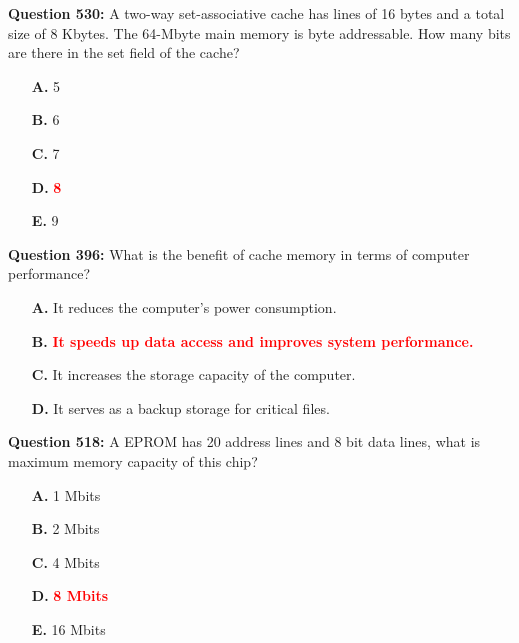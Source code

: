 \documentclass[12pt,a4paper]{article}
\begin{document}
\vspace{0.5cm}

\vspace{0.5cm}

\textbf{Question 530:} A two-way set-associative cache has lines of 16 bytes and a total size of 8 Kbytes. The 64-Mbyte main memory is byte addressable. How many bits are there in the set field of the cache?

\begin{itemize}
    \item[\textbf{A.}] 5
    \item[\textbf{B.}] 6
    \item[\textbf{C.}] 7
    \item[\textbf{D.}] \textcolor{red}{\textbf{8}}
    \item[\textbf{E.}] 9
\end{itemize}

\vspace{0.5cm}

\vspace{0.5cm}

\textbf{Question 396:} What is the benefit of cache memory in terms of computer performance?

\begin{itemize}
    \item[\textbf{A.}] It reduces the computer's power consumption.
    \item[\textbf{B.}] \textcolor{red}{\textbf{It speeds up data access and improves system performance.}}
    \item[\textbf{C.}] It increases the storage capacity of the computer.
    \item[\textbf{D.}] It serves as a backup storage for critical files.
\end{itemize}

\vspace{0.5cm}

\vspace{0.5cm}

\textbf{Question 518:} A EPROM has 20 address lines and 8 bit data lines, what is maximum memory capacity of this chip?

\begin{itemize}
    \item[\textbf{A.}] 1 Mbits
    \item[\textbf{B.}] 2 Mbits
    \item[\textbf{C.}] 4 Mbits
    \item[\textbf{D.}] \textcolor{red}{\textbf{8 Mbits}}
    \item[\textbf{E.}] 16 Mbits
\end{itemize}
\end{document}
